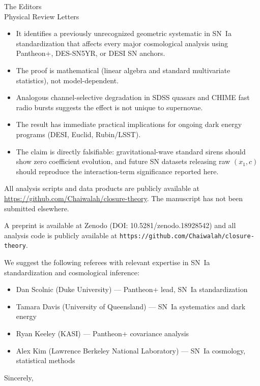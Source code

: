 \documentclass[12pt]{letter}
\begin{document}
\begin{letter}{The Editors\\Physical Review Letters}
\begin{itemize}
\item It identifies a previously unrecognized geometric systematic in SN~Ia standardization that affects every major cosmological analysis using Pantheon+, DES-SN5YR, or DESI SN anchors.
\item The proof is mathematical (linear algebra and standard multivariate statistics), not model-dependent.
\item Analogous channel-selective degradation in SDSS quasars and CHIME fast radio bursts suggests the effect is not unique to supernovae.
\item The result has immediate practical implications for ongoing dark energy programs (DESI, Euclid, Rubin/LSST).
\item The claim is directly falsifiable: gravitational-wave standard sirens should show zero coefficient evolution, and future SN datasets releasing raw $(x_1, c)$ should reproduce the interaction-term significance reported here.
\end{itemize}

All analysis scripts and data products are publicly available at \url{https://github.com/Chaiwalah/closure-theory}. The manuscript has not been submitted elsewhere.

A preprint is available at Zenodo (DOI: 10.5281/zenodo.18928542) and all analysis code is publicly available at \texttt{https://github.com/Chaiwalah/closure-theory}.

We suggest the following referees with relevant expertise in SN~Ia standardization and cosmological inference:

\begin{itemize}
\item Dan Scolnic (Duke University) --- Pantheon+ lead, SN~Ia standardization
\item Tamara Davis (University of Queensland) --- SN~Ia systematics and dark energy
\item Ryan Keeley (KASI) --- Pantheon+ covariance analysis
\item Alex Kim (Lawrence Berkeley National Laboratory) --- SN~Ia cosmology, statistical methods
\end{itemize}

\closing{Sincerely,}

\end{letter}
\end{document}
